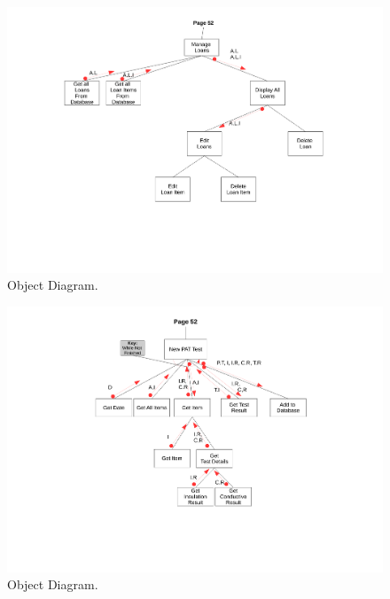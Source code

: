 \begin{landscape}
\newpage

\begin{figure}[H]
    \begin{center}
    \includegraphics[width=500px]{./Design/top_down_design/manage_loans.pdf}
    \caption{Object Diagram.} \label{fig:object_diagram}
    \end{center}
\end{figure}

\newpage

\begin{figure}[H]
    \begin{center}
    \includegraphics[width=500px]{./Design/top_down_design/new_pat_test}
    \caption{Object Diagram.} \label{fig:object_diagram}
    \end{center}
\end{figure}


\end{landscape}
